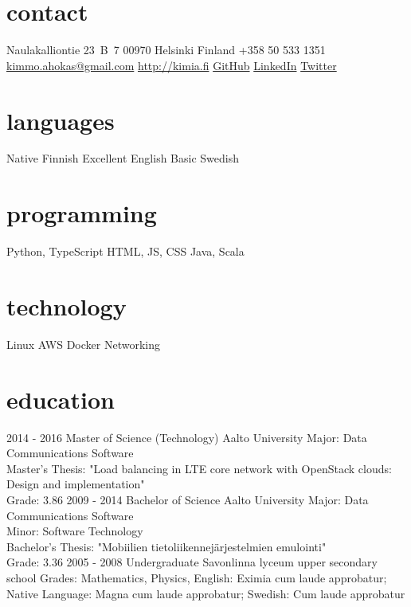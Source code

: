 \documentclass[]{friggeri-cv-a4}
\begin{document}


\begin{aside}
  \section{contact}
    Naulakalliontie 23~B~7
    00970 Helsinki
    Finland
    +358 50 533 1351
    ~
    \href{mailto:kimmo.ahokas@gmail.com}{kimmo.ahokas@gmail.com}
    \href{http://kimia.fi}{http://kimia.fi}
    \href{https://github.com/kimmoahokas}{GitHub}
    \href{https://www.linkedin.com/in/kimmoahokas}{LinkedIn}
    \href{https://twitter.com/kimmoahokas}{Twitter}
  \section{languages}
    Native Finnish
    Excellent English
    Basic Swedish
  \section{programming}
    Python, TypeScript
    HTML, JS, CSS
    Java, Scala
  \section{technology}
    Linux
    AWS
    Docker
    Networking
\end{aside}

\section{education}

\begin{entrylist}
  \entry
    {2014 - 2016}
    {Master of Science (Technology)}
    {Aalto University}
    {Major: Data Communications Software\\
    Master's Thesis: "Load balancing in LTE core network with OpenStack clouds:
    Design and implementation"\\
    Grade: 3.86}
  \entry
    {2009 - 2014}
    {Bachelor of Science}
    {Aalto University}
    {Major: Data Communications Software\\
    Minor: Software Technology\\
    Bachelor's Thesis: "Mobiilien tietoliikennejärjestelmien emulointi"\\
    Grade: 3.36}
  \entry
    {2005 - 2008}
    {Undergraduate}
    {Savonlinna lyceum upper secondary school}
    {Grades: Mathematics, Physics, English: Eximia cum laude approbatur; Native Language: Magna cum laude approbatur; Swedish: Cum laude approbatur}
\end{entrylist}
\end{document}
